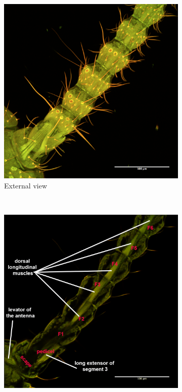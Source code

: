 \documentclass[letterpaper, 11pt]{article}
\begin{document}
\begin{figure}[ht!]
    \centering
    \begin{subfigure}[ht!]{0.45\textwidth}
        \includegraphics[width=\textwidth]{image11}
        \caption{External view}
        \label{fig:diplant1}
    \end{subfigure}
    ~ %
    \begin{subfigure}[ht!]{0.45\textwidth}
        \includegraphics[width=\textwidth]{image26}

\end{subfigure}
\end{figure}
\end{document}
